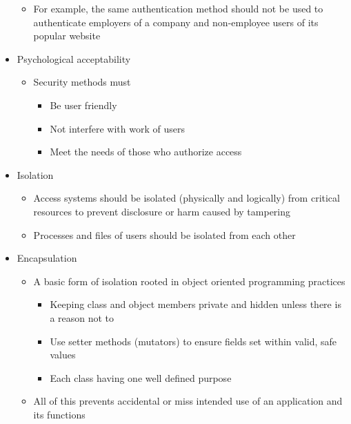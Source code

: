 \documentclass[12pt]{article}
\begin{document}
\begin{itemize}
\begin{itemize}
                    \item For example, the same authentication method should not be used to authenticate employers
                    of a company and non-employee users of its popular website
                \end{itemize}
            \item Psychological acceptability
                \begin{itemize}
                    \item Security methods must
                        \begin{itemize}
                            \item Be user friendly
                            \item Not interfere with work of users
                            \item Meet the needs of those who authorize access
                        \end{itemize}
                \end{itemize}
            \item Isolation
                \begin{itemize}
                    \item Access systems should be isolated (physically and logically) from critical resources to
                    prevent disclosure or harm caused by tampering
                    \item Processes and files of users should be isolated from each other
                \end{itemize}
            \item Encapsulation
                \begin{itemize}
                    \item A basic form of isolation rooted in object oriented programming practices
                        \begin{itemize}
                            \item Keeping class and object members private and hidden unless there is a reason not to
                            \item Use setter methods (mutators) to ensure fields set within valid, safe values
                            \item Each class having one well defined purpose
                        \end{itemize}
                    \item All of this prevents accidental or miss intended use of an application and its functions

\end{itemize}
\end{itemize}
\end{document}
